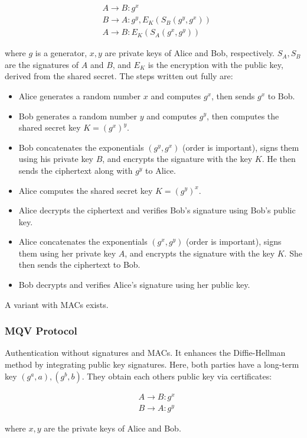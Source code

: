 \begin{align*}
    &A \rightarrow B: g^x\\
    &B \rightarrow A: g^y, E_K(S_B(g^y, g^x))\\
    &A \rightarrow B: E_K(S_A(g^x, g^y))
\end{align*}

where $g$ is a generator, $x, y$ are private keys of Alice and Bob, respectively.
$S_A, S_B$ are the signatures of $A$ and $B$, and $E_K$ is the encryption with the public key, derived from the shared secret. The steps written out fully are:

\begin{itemize}
    \item Alice generates a random number \( x \) and computes \( g^x \), then sends \( g^x \) to Bob.
    \item Bob generates a random number \( y \) and computes \( g^y \), then computes the shared secret key \( K = (g^x)^y \).
    \item Bob concatenates the exponentials \( (g^y, g^x) \) (order is important), signs them using his private key \( B \), and encrypts the signature with the key \( K \). He then sends the ciphertext along with \( g^y \) to Alice.
    \item Alice computes the shared secret key \( K = (g^y)^x \).
    \item Alice decrypts the ciphertext and verifies Bob's signature using Bob's public key.
    \item Alice concatenates the exponentials \( (g^x, g^y) \) (order is important), signs them using her private key \( A \), and encrypts the signature with the key \( K \). She then sends the ciphertext to Bob.
    \item Bob decrypts and verifies Alice's signature using her public key.
\end{itemize}

A variant with MACs exists.

\subsubsection{MQV Protocol}
Authentication without signatures and MACs. It enhances the Diffie-Hellman method by integrating public key signatures. 
Here, both parties have a long-term key $(g^a, a), (g^b, b)$.
They obtain each others public key via certificates:

\begin{align*}
    &A \rightarrow B: g^x\\
    &B \rightarrow A: g^y
\end{align*}

where $x,y$ are the private keys of Alice and Bob. 
